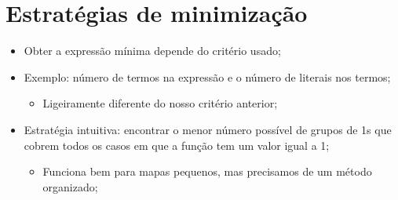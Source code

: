 

\subtitle{Mapas de Karnaugh} %




\begin{frame}
	\titlepage
\end{frame} 


\section{Estratégias de minimização}

\begin{frame}{\insertsection} %
	\begin{itemize}
		\item Obter a expressão mínima depende do critério usado;
		\item Exemplo: número de termos na expressão e o número de literais nos termos;
		\begin{itemize}
		    \item Ligeiramente diferente do nosso critério anterior; 
		\end{itemize}
		\item Estratégia intuitiva: encontrar o menor número possível de grupos de 1s que cobrem todos os casos em que a função tem um valor igual a 1;
		\begin{itemize}
		    \item Funciona bem para mapas pequenos, mas precisamos de um método organizado;
		\end{itemize}
    \end{itemize}
\end{frame}

